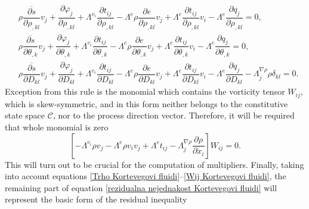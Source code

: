 \documentclass[a4paper,fleqn]{cas-sc}
\theoremstyle{definition}
\begin{document}
\begin{align}
	\label{X_jrho_,kl Kortevegovi fluidi}
	& \rho\overline{\dfrac{\partial s}{\partial\rho_{,kl}}}v_j+\dfrac{\partial\varphi_j}{\partial\rho_{,kl}}+\Lambda^{v_i}\dfrac{\partial t_{ij}}{\partial\rho_{,kl}}-\Lambda^e\rho\dfrac{\partial e}{\partial\rho_{,kl}}v_j+\Lambda^e\dfrac{\partial t_{ij}}{\partial\rho_{,kl}}v_i-\Lambda^e\dfrac{\partial q_j}{\partial\rho_{,kl}}=0, 
	\\
	\label{X_jtheta_,k Kortevegovi fluidi}
	& \rho\overline{\dfrac{\partial s}{\partial\theta_{,k}}}v_j+\dfrac{\partial\varphi_j}{\partial\theta_{,k}}+\Lambda^{v_i}\dfrac{\partial t_{ij}}{\partial\theta_{,k}}-\Lambda^e\rho\dfrac{\partial e}{\partial\theta_{,k}}v_j+\Lambda^e\dfrac{\partial t_{ij}}{\partial\theta_{,k}}v_i-\Lambda^e\dfrac{\partial q_j}{\partial\theta_{,k}}=0, 
	\\
	\label{X_jD_kl Kortevegovi fluidi}
	& \rho\overline{\dfrac{\partial s}{\partial D_{kl}}}v_j+\dfrac{\partial\varphi_j}{\partial D_{kl}}+\Lambda^{v_i}\dfrac{\partial t_{ij}}{\partial D_{kl}}-\Lambda^e\rho\dfrac{\partial e}{\partial D_{kl}}v_j+\Lambda^e\dfrac{\partial t_{ij}}{\partial D_{kl}}v_i-\Lambda^e\dfrac{\partial q_j}{\partial D_{kl}}-\Lambda^{\nabla\rho}_j\rho\delta_{kl}=0.
\end{align}
Exception from this rule is the monomial which contains the vorticity tensor $W_{ij}$, which is skew-symmetric, and in this form neither belongs to the constitutive state space $\mathcal{C}$, nor to the process direction vector. Therefore, it will be required that whole monomial is zero
\begin{equation} \label{Wij Kortevegovi fluidi}
	\left[-\Lambda^{v_i}\rho v_j-\Lambda^e\rho v_iv_j+\Lambda^e t_{ij}-\Lambda^{\nabla\rho}_j\dfrac{\partial\rho}{\partial x_i}\right]W_{ij}=0.
\end{equation}
This will turn out to be crucial for the computation of multipliers. Finally, taking into account equations \eqref{Trho Kortevegovi fluidi}--\eqref{Wij Kortevegovi fluidi}, the remaining part of equation \eqref{rezidualna nejednakost Kortevegovi fluidi} will represent the basic form of the residual inequality
\end{document}
